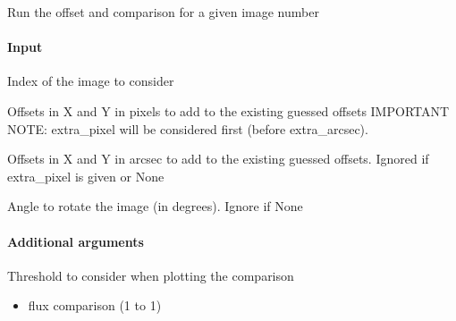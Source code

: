 \documentclass[letterpaper,10pt,english]{sphinxmanual}
\begin{document}
\begin{fulllineitems}
\begin{fulllineitems}
\label{\detokenize{api/pymusepipe:pymusepipe.align_pipe.AlignMuseDataset.offset_and_compare_ima}}
\pysigstartsignatures
{}
\pysigstopsignatures
\sphinxAtStartPar
Run the offset and comparison for a given image number


\paragraph{Input}
\label{\detokenize{api/pymusepipe:id18}}\begin{description}
\sphinxAtStartPar
Index of the image to consider

\sphinxAtStartPar
Offsets in X and Y in pixels to add to the existing
guessed offsets
IMPORTANT NOTE: extra\_pixel will be considered first
(before extra\_arcsec).

\sphinxAtStartPar
Offsets in X and Y in arcsec to add to the existing
guessed offsets. Ignored if extra\_pixel is given or None

\sphinxAtStartPar
Angle to rotate the image (in degrees). Ignore if None

\end{description}


\paragraph{Additional arguments}
\label{\detokenize{api/pymusepipe:additional-arguments}}\begin{description}
\sphinxAtStartPar
Threshold to consider when plotting the comparison

\begin{description}
\begin{itemize}
\item {} 
\sphinxAtStartPar
flux comparison (1 to 1)


\end{itemize}
\end{description}
\end{description}
\end{fulllineitems}
\end{fulllineitems}
\end{document}
